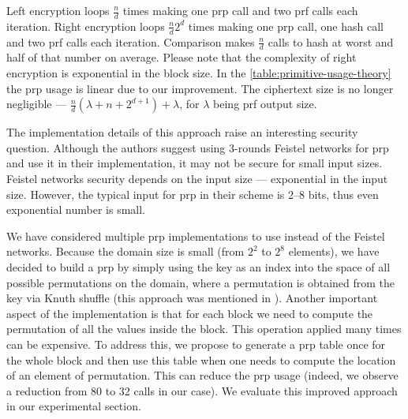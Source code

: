 		Left encryption loops $\frac{n}{d}$ times making one \acrshort{prp} call and two \acrshort{prf} calls each iteration.
		Right encryption loops $\frac{n}{d} 2^d$ times making one \acrshort{prp} call, one hash call and two \acrshort{prf} calls each iteration.
		Comparison makes $\frac{n}{d}$ calls to hash at worst and half of that number on average.
		Please note that the complexity of right encryption is exponential in the block size.
		In the \cref{table:primitive-usage-theory} the \acrshort{prp} usage is linear due to our improvement.
		The ciphertext size is no longer negligible --- $\frac{n}{d} \left(\lambda + n + 2^{d + 1} \right) + \lambda$, for $\lambda$ being \acrshort{prf} output size.

		The implementation details of this approach raise an interesting security question.
		Although the authors suggest using 3-rounds Feistel networks \cite{unbalanced-feistel} for \acrshort{prp} and use it in their implementation, it may not be secure for small input sizes.
		Feistel networks security depends on the input size \cite{feistel-security} --- exponential in the input size.
		However, the typical input for \acrshort{prp} in their scheme is 2--8 bits, thus even exponential number is small.

		We have considered multiple \acrshort{prp} implementations to use instead of the Feistel networks.
		Because the domain size is small (from $2^2$ to $2^8$ elements), we have decided to build a \acrshort{prp} by simply using the key as an index into the space of all possible permutations on the domain, where a permutation is obtained from the key via Knuth shuffle (this approach was mentioned in \cite{knuth-shuffle-security}).
		Another important aspect of the implementation is that for each block we need to compute the permutation of all the values inside the block.
		This operation applied many times can be expensive.
		To address this, we propose to generate a \acrshort{prp} table once for the whole block and then use this table when one needs to compute the location of an element of permutation.
		This can reduce the \acrshort{prp} usage (indeed, we observe a reduction from 80 to 32 calls in our case).
		We evaluate this improved approach in our experimental section.
